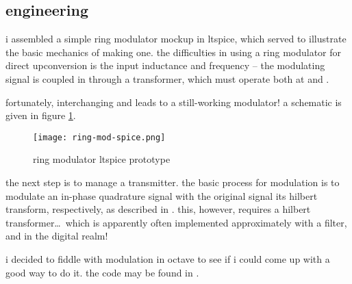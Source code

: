 \subsection*{engineering}
i assembled a simple ring modulator mockup in ltspice, which served to
illustrate the basic mechanics of making one. the difficulties in using a ring
modulator for direct upconversion is the input inductance and frequency -- the
modulating signal is coupled in through a transformer, which must operate both
at \rf and \ifreq.

fortunately, interchanging \rf and \ifreq leads to a still-working modulator! a
schematic is given in figure \ref{fig:ring-mod-spice}.

\begin{figure}[H]
	\centering
	\texttt{[image: ring-mod-spice.png]}
	\caption{ring modulator ltspice prototype}
	\label{fig:ring-mod-spice}
\end{figure}

the next step is to manage a \ssb transmitter. the basic process for \ssb
modulation is to modulate an in-phase \amp quadrature signal with the original
signal \amp its hilbert transform, respectively, as described in
\autocite{matlab-ssb}. this, however, requires a hilbert transformer\ldots\
which is apparently often implemented approximately with a filter, and in the
digital realm!

i decided to fiddle with \ssb modulation in octave to see if i could come up
with a good way to do it. the code may be found in
.
